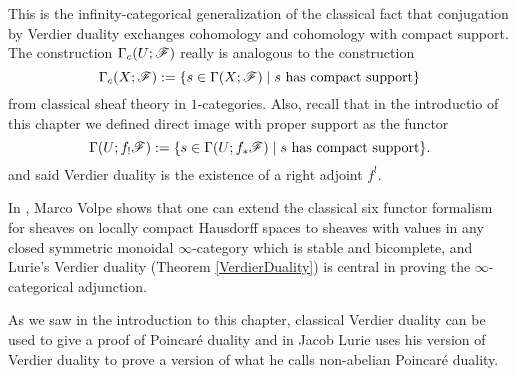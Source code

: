 \documentclass[../../thesis.tex]{subfiles}
\begin{document}
\begin{remark}
    This is the infinity-categorical generalization of the classical fact that conjugation by Verdier duality exchanges cohomology and cohomology with compact support.
    The construction $\Gamma_c(U;\mathscr{F})$ really is analogous to the construction
    \[
        \Gamma_c(X ; \mathscr{F}) := \{ s \in \Gamma(X; \mathscr{F}) \mid s\text{ has compact support}\}
    \]
    from classical sheaf theory in $1$-categories.
    Also, recall that in the introductio of this chapter we defined direct image with proper support as the functor
    \[
        \Gamma(U; f_!\mathscr{F}) : = \{ s \in \Gamma(U; f_*\mathscr{F}) \mid s \text{ has compact support}\}.
    \]
    and said Verdier duality is the existence of a right adjoint $f^!$.


    In \cite{Volpe}, Marco Volpe shows that one can extend the classical six functor formalism for sheaves on locally compact Hausdorff spaces to sheaves with values in any closed symmetric monoidal $\infty$-category which is stable and bicomplete, and Lurie's Verdier duality (Theorem \ref{VerdierDuality}) is central in proving the $\infty$-categorical adjunction.
\end{remark}
\begin{remark}
    As we saw in the introduction to this chapter, classical Verdier duality can be used to give a proof of Poincaré duality and in \cite[Section 5.5.6]{HA} Jacob Lurie uses his version of Verdier duality to prove a version of what he calls non-abelian Poincaré duality.
\end{remark}
\end{document}
